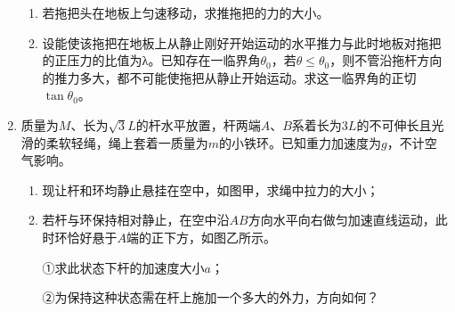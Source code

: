 \begin{enumerate}
\begin{enumerate}
\item 
若拖把头在地板上匀速移动，求推拖把的力的大小。

\item 
设能使该拖把在地板上从静止刚好开始运动的水平推力与此时地板对拖把的正压力的比值为λ。已知存在一临界角$ \theta _0 $，若$ \theta \leq \theta _ 0 $，则不管沿拖杆方向的推力多大，都不可能使拖把从静止开始运动。求这一临界角的正切$ \tan \theta _0 $。
\end{enumerate}
\begin{figure}[h!]
\flushright

\end{figure}

\banswer{

}



\newpage	
\item 
{}
质量为$ M $、长为$ \sqrt{3}L $的杆水平放置，杆两端$ A $、$ B $系着长为$ 3L $的不可伸长且光滑的柔软轻绳，绳上套着一质量为$ m $的小铁环。已知重力加速度为$ g $，不计空气影响。
\begin{enumerate}
\renewcommand{\labelenumi}{\arabic{enumi}.}
\item
现让杆和环均静止悬挂在空中，如图甲，求绳中拉力的大小；
\item 
若杆与环保持相对静止，在空中沿$ AB $方向水平向右做匀加速直线运动，此时环恰好悬于$ A $端的正下方，如图乙所示。

①求此状态下杆的加速度大小$ a $；

②为保持这种状态需在杆上施加一个多大的外力，方向如何？



\end{enumerate}
\begin{figure}[h!]
\flushright
 \qquad \qquad 
	
\end{figure}

\banswer{

}




\end{enumerate}











